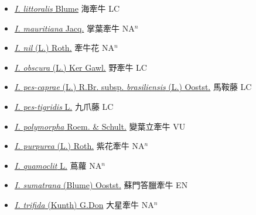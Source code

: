 \begin{itemize}
\begin{itemize}
        \item[] \href{http://www.theplantlist.org/tpl1.1/search?q=Ipomoea+littoralis}{\textit{I. littoralis} Blume}   海牽牛 LC
        \item[] \href{http://www.theplantlist.org/tpl1.1/search?q=Ipomoea+mauritiana}{\textit{I. mauritiana} Jacq.}   掌葉牽牛 NA$^n$
        \item[] \href{http://www.theplantlist.org/tpl1.1/search?q=Ipomoea+nil}{\textit{I. nil} (L.) Roth.}   牽牛花 NA$^n$
        \item[] \href{http://www.theplantlist.org/tpl1.1/search?q=Ipomoea+obscura}{\textit{I. obscura} (L.) Ker Gawl.}   野牽牛 LC
        \item[] \href{http://www.theplantlist.org/tpl1.1/search?q=Ipomoea+pes-caprae+subsp.+brasiliensis}{\textit{I. pes-caprae} (L.) R.Br. subsp. \textit{brasiliensis} (L.) Oostst.}   馬鞍藤 LC
        \item[] \href{http://www.theplantlist.org/tpl1.1/search?q=Ipomoea+pes-tigridis}{\textit{I. pes-tigridis} L.}   九爪藤 LC
        \item[] \href{http://www.theplantlist.org/tpl1.1/search?q=Ipomoea+polymorpha}{\textit{I. polymorpha} Roem. \& Schult.}   變葉立牽牛 VU
        \item[] \href{http://www.theplantlist.org/tpl1.1/search?q=Ipomoea+purpurea}{\textit{I. purpurea} (L.) Roth.}   紫花牽牛 NA$^n$
        \item[] \href{http://www.theplantlist.org/tpl1.1/search?q=Ipomoea+quamoclit}{\textit{I. quamoclit} L.}   蔦蘿 NA$^n$
        \item[] \href{http://www.theplantlist.org/tpl1.1/search?q=Ipomoea+sumatrana}{\textit{I. sumatrana} (Blume) Oostst.}   蘇門答臘牽牛 EN
        \item[] \href{http://www.theplantlist.org/tpl1.1/search?q=Ipomoea+trifida}{\textit{I. trifida} (Kunth) G.Don}   大星牽牛 NA$^n$

\end{itemize}
\end{itemize}
